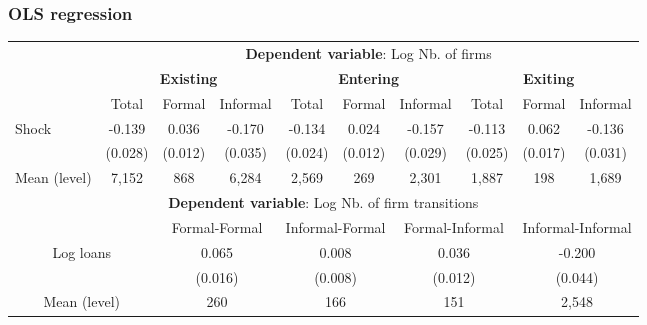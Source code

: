 \documentclass[aspectratio=169]{beamer}
\begin{document}
\begin{frame}[noframenumbering]
\frametitle{\textbf{OLS regression}} \label{ols}

\begin{center}
    \scriptsize
    \begin{tabular}{lccccccccc}
        \toprule
        & \multicolumn{9}{c}{\textbf{Dependent variable}: Log Nb. of firms} \\
        \cmidrule(lr){2-10}
         & \multicolumn{3}{c}{\textbf{Existing}} & \multicolumn{3}{c}{\textbf{Entering}} & \multicolumn{3}{c}{\textbf{Exiting}} \\
        \cmidrule(lr){2-10}
        & Total 
        & Formal 
        & \multicolumn{1}{c}{Informal}
        & Total 
        & Formal 
        & \multicolumn{1}{c}{Informal}
        & Total 
        & Formal 
        & Informal \\
        \midrule
        Shock 
        &  -0.139  & 0.036  & -0.170   &  -0.134  & 0.024   & -0.157  & -0.113   & 0.062   & -0.136 \\
        & (0.028) & (0.012) & (0.035) & (0.024) & (0.012) & (0.029) & (0.025) & (0.017) & (0.031) \\
        \midrule
        Mean (level) & 7,152 & 868 & 6,284 & 2,569 & 269 & 2,301 & 1,887 & 198 & 1,689\\
        
        \multicolumn{10}{c}{\textbf{Dependent variable}: Log Nb. of firm transitions} \\
        \cmidrule(lr){3-10}
        
        \multicolumn{2}{c}{} & \multicolumn{2}{c}{Formal-Formal} & \multicolumn{2}{c}{Informal-Formal} & \multicolumn{2}{c}{Formal-Informal} & \multicolumn{2}{c}{Informal-Informal} \\
        \midrule 
        \multicolumn{2}{c}{Log loans} & \multicolumn{2}{c}{0.065} & \multicolumn{2}{c}{0.008} & \multicolumn{2}{c}{0.036} & \multicolumn{2}{c}{-0.200} \\
        \multicolumn{2}{c}{} & \multicolumn{2}{c}{(0.016)} & \multicolumn{2}{c}{(0.008)} & \multicolumn{2}{c}{(0.012)} & \multicolumn{2}{c}{(0.044)} \\
        \midrule
        \multicolumn{2}{c}{Mean (level)} & \multicolumn{2}{c}{260} & \multicolumn{2}{c}{166} & \multicolumn{2}{c}{151} & \multicolumn{2}{c}{2,548} \\
        
        \bottomrule
    \end{tabular}
\end{center}

\hyperlink{main_result}{}

\end{frame}
\end{document}
